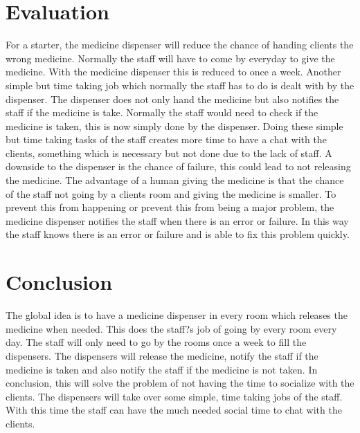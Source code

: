 \documentclass{article}
\begin{document}
\section{Evaluation}
For a starter, the medicine dispenser will reduce the chance of handing clients the wrong medicine. Normally the staff will have to come by everyday to give the medicine. With the medicine dispenser this is reduced to once a week\cite{Lamport:LaTeX}. Another simple but time taking job which normally the staff has to do is dealt with by the dispenser. The dispenser does not only hand the medicine but also notifies the staff if the medicine is take. Normally the staff would need to check if the medicine is taken, this is now simply done by the dispenser.
Doing these simple but time taking tasks of the staff creates more time to have a chat with the clients, something which is necessary but not done due to the lack of staff.
A downside to the dispenser is the chance of failure, this could lead to not releasing the medicine. The advantage of a human giving the medicine is that the chance of the staff not going by a clients room and giving the medicine is smaller. To prevent this from happening or prevent this from being a major problem, the medicine dispenser notifies the staff when there is an error or failure. In this way the staff knows there is an error or failure and is able to fix this problem quickly.

\section{Conclusion}
The global idea is to have a medicine dispenser in every room which releases the medicine when needed. This does the staff?s job of going by every room every day. The staff will only need to go by the rooms once a week to fill the dispensers. The dispensers will release the medicine, notify the staff if the medicine is taken and also notify the staff if the medicine is not taken.
 In conclusion, this will solve the problem of not having the time to socialize with the clients. The dispensers will take over some simple, time taking jobs of the staff. With this time the staff can have the much needed social time to chat with the clients.
\newpage


	
\end{document}
